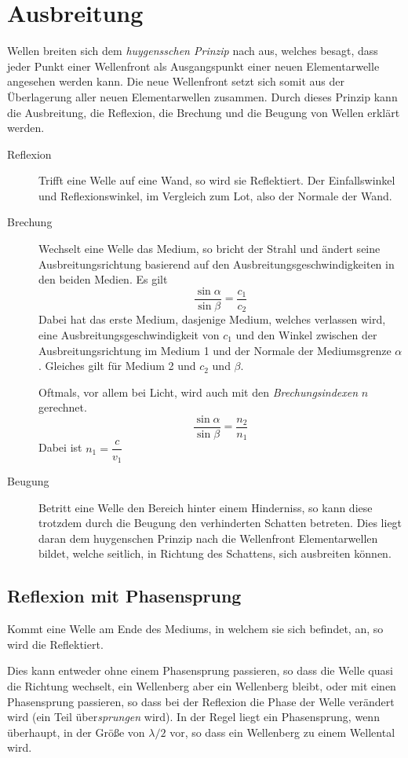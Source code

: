 \documentclass{article}
\begin{document}
\section{Ausbreitung} 
Wellen breiten sich dem \emph{huygensschen Prinzip} nach aus, welches besagt, dass jeder Punkt einer Wellenfront als Ausgangspunkt einer neuen Elementarwelle angesehen werden kann. Die neue Wellenfront setzt sich somit aus der Überlagerung aller neuen Elementarwellen zusammen. \newline
Durch dieses Prinzip kann die Ausbreitung, die Reflexion, die Brechung und die Beugung von Wellen erklärt werden.  
\begin{description} 
 \item[Reflexion] Trifft eine Welle auf eine Wand, so wird sie Reflektiert. Der Einfallswinkel und Reflexionswinkel, im Vergleich zum Lot, also der Normale der Wand.
 \item[Brechung] Wechselt eine Welle das Medium, so bricht der Strahl und ändert seine Ausbreitungsrichtung basierend auf den Ausbreitungsgeschwindigkeiten in den beiden Medien. Es gilt 
\[
 \frac{\sin \alpha}{\sin \beta} = \frac{c_1}{c_2} 
\] 
Dabei hat das erste Medium, dasjenige Medium, welches verlassen wird, eine Ausbreitungsgeschwindigkeit von $c_1$ und den Winkel zwischen der Ausbreitungsrichtung im Medium 1 und der Normale der Mediumsgrenze $\alpha$. Gleiches gilt für Medium 2 und $c_2$ und $\beta$.
 
Oftmals, vor allem bei Licht, wird auch mit den \emph{Brechungsindexen} $n$ gerechnet. 
\[
 \frac{\sin \alpha}{\sin \beta} = \frac{n_2}{n_1} 
\]
Dabei ist $n_1 = \dfrac{c}{v_1}$  
  \item[Beugung] Betritt eine Welle den Bereich hinter einem Hinderniss, so kann diese trotzdem durch die Beugung den verhinderten Schatten betreten. Dies liegt daran dem huygenschen Prinzip nach die Wellenfront Elementarwellen bildet, welche seitlich, in Richtung des Schattens, sich ausbreiten können.
\end{description}  
 
\subsection{Reflexion mit Phasensprung}
Kommt eine Welle am Ende des Mediums, in welchem sie sich befindet, an, so wird die Reflektiert.
 
Dies kann entweder ohne einem Phasensprung passieren, so dass die Welle quasi die Richtung wechselt, ein Wellenberg aber ein Wellenberg bleibt, oder mit einen Phasensprung passieren, so dass bei der Reflexion die Phase der Welle verändert wird (ein Teil über\emph{sprungen} wird). In der Regel liegt ein Phasensprung, wenn überhaupt, in der Größe von $\lambda / 2$ vor, so dass ein Wellenberg zu einem Wellental wird.
 
\end{document}
